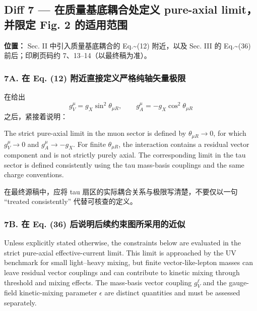 \documentclass[
]{article}
\begin{document}
\subsection{Diff 7 --- 在质量基底耦合处定义 pure-axial limit，并限定
Fig. 2
的适用范围}\label{diff-7-ux5728ux8d28ux91cfux57faux5e95ux8026ux5408ux5904ux5b9aux4e49-pure-axial-limitux5e76ux9650ux5b9a-fig.-2-ux7684ux9002ux7528ux8303ux56f4}

\textbf{位置：} Sec. II 中引入质量基底耦合的 Eq.\textasciitilde(12)
附近，以及 Sec. III 的 Eq.\textasciitilde(36) 前后；印刷页码约
7、13--14（以最终稿为准）。

\subsubsection{7A. 在 Eq. (12)
附近直接定义严格纯轴矢量极限}\label{a.-ux5728-eq.-12-ux9644ux8fd1ux76f4ux63a5ux5b9aux4e49ux4e25ux683cux7eafux8f74ux77e2ux91cfux6781ux9650}

在给出 \[
g_V^\mu=g_X\sin^2\theta_{\mu R},\qquad
g_A^\mu=-g_X\cos^2\theta_{\mu R}
\] 之后，紧接着说明：

The strict pure-axial limit in the muon sector is defined by
\(\theta_{\mu R}\to 0\), for which \(g_V^\mu\to 0\) and
\(g_A^\mu\to -g_X\). For finite \(\theta_{\mu R}\), the interaction
contains a residual vector component and is not strictly purely axial.
The corresponding limit in the tau sector is defined consistently
using the tau mass-basis couplings and the same charge conventions.

在最终源稿中，应将 tau 扇区的实际耦合关系与极限写清楚，不要仅以一句
``treated consistently'' 代替可核查的定义。

\subsubsection{7B. 在 Eq. (36)
后说明后续约束图所采用的近似}\label{b.-ux5728-eq.-36-ux540eux8bf4ux660eux540eux7eedux7ea6ux675fux56feux6240ux91c7ux7528ux7684ux8fd1ux4f3c}

Unless explicitly stated otherwise, the constraints below are
evaluated in the strict pure-axial effective-current limit. This
limit is approached by the UV benchmark for small light--heavy
mixing, but finite vector-like-lepton masses can leave residual
vector couplings and can contribute to kinetic mixing through
threshold and mixing effects. The mass-basis vector coupling
\(g_V^\ell\) and the gauge-field kinetic-mixing parameter
\(\epsilon\) are distinct quantities and must be assessed separately.
\end{document}
